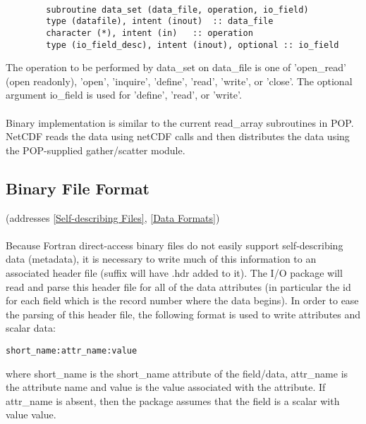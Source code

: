 \documentclass[11pt]{article}
\begin{document}
\begin{verbatim}

		subroutine data_set (data_file, operation, io_field)
		type (datafile), intent (inout)  :: data_file
		character (*), intent (in)   :: operation
		type (io_field_desc), intent (inout), optional :: io_field

\end{verbatim}
\noindent
The operation to be performed by data\_set on data\_file is one of 
'open\_read' (open readonly), 'open', 'inquire', 'define', 
'read', 'write', or 'close'.  
The optional argument io\_field is used for 
'define', 'read', or 'write'.

\paragraph{}
Binary implementation is similar to the current read\_array 
subroutines in POP.  
NetCDF reads the data using netCDF calls and then distributes the 
data using the POP-supplied gather/scatter module.

\subsection{Binary File Format}
\label{Binary File Format}
(addresses \ref{Self-describing Files}, \ref{Data Formats})
\paragraph{}
Because Fortran direct-access binary files do not easily support 
self-describing data (metadata), it is necessary to write much 
of this information to an associated header file 
(suffix will have .hdr added to it).  
The I/O package will read and parse this header file 
for all of the data attributes 
(in particular the id for each field which is the record number 
where the data begins).  
In order to ease the parsing of this header file, the following 
format is used to write attributes and scalar data:
\begin{verbatim}
short_name:attr_name:value
\end{verbatim}
\noindent
where short\_name is the short\_name attribute of the field/data, 
attr\_name is the attribute name and value is the value associated 
with the attribute.  
If attr\_name is absent, then the package assumes that the field 
is a scalar with value value.  
\end{document}
